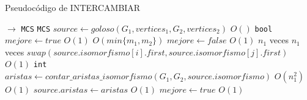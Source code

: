 
\begin{algorithm}[H]
  \small
  \begin{algorithmic}[1]
  \caption{Pseudocódigo de INTERCAMBIAR}
  \label{algo:1-1}
    $\rightarrow$ \texttt{MCS}
      \State \texttt{MCS} $source \gets goloso(G_1, vertices_1, G_2, vertices_2)$
      \Comment $O()$
      \State \texttt{bool} $mejore \gets true$
      \Comment $O(1)$
      \Comment $O(min\{m_1, m_2\})$
        \State $mejore \gets false$
        \Comment $O(1)$
        \Comment $n_1$ veces
          \Comment $n_1$ veces
            \State $swap(source.isomorfismo[i].first, source.isomorfismo[j].first)$
            \Comment $O(1)$
            \State \texttt{int} $aristas \gets contar\_aristas\_isomorfismo(G_1, G_2, source.isomorfismo)$
            \Comment $O(n_1^2)$
            \Comment $O(1)$
              \State $source.aristas \gets aristas$ 
              \Comment $O(1)$             
              \State $mejore \gets true$
              \Comment $O(1)$
            \EndIf
          \EndFor
        \EndFor
      \EndWhile
    \EndProcedure
  \end{algorithmic}
\end{algorithm}

